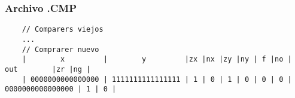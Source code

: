 \documentclass[12pt]{article}
\begin{document}
        \subsubsection{Archivo .CMP}
\begin{lstlisting}
    // Comparers viejos
    ...
    // Comprarer nuevo
    |        x         |        y         |zx |nx |zy |ny | f |no |       out        |zr |ng |
    | 0000000000000000 | 1111111111111111 | 1 | 0 | 1 | 0 | 0 | 0 | 0000000000000000 | 1 | 0 |
\end{lstlisting}
\newpage

\printbibliography[heading=bibintoc]
\end{document}

